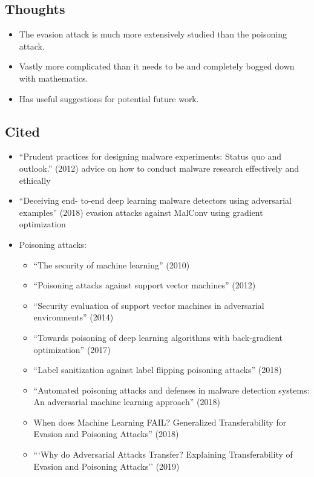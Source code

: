 \documentclass{article}
\begin{document}
\subsection*{Thoughts}
\begin{itemize}
\item The evasion attack is much more extensively studied than the poisoning attack.
\item Vastly more complicated than it needs to be and completely bogged down with mathematics.
\item Has useful suggestions for potential future work.
\end{itemize}

\subsection*{Cited}
\begin{itemize}
\item ``Prudent practices for designing malware experiments: Status quo and outlook.'' (2012) advice on how to conduct malware research effectively and ethically
\item ``Deceiving end- to-end deep learning malware detectors using adversarial examples'' (2018) evasion attacks against MalConv using gradient optimization
\item Poisoning attacks:
	\begin{itemize}
	\item ``The security of machine learning'' (2010)
	\item ``Poisoning attacks against support vector machines'' (2012)
	\item ``Security evaluation of support vector machines in adversarial environments'' (2014)
	\item ``Towards poisoning of deep learning algorithms with back-gradient optimization'' (2017)
	\item ``Label sanitization against label flipping poisoning attacks'' (2018)
	\item ``Automated poisoning attacks and defenses in malware detection systems: An adversarial machine learning approach'' (2018)
	\item When does Machine Learning FAIL? Generalized Transferability for Evasion and Poisoning Attacks'' (2018)
	\item ```Why do Adversarial Attacks Transfer? Explaining Transferability of Evasion and Poisoning Attacks'' (2019)
	\end{itemize}
\end{itemize}
\end{document}
